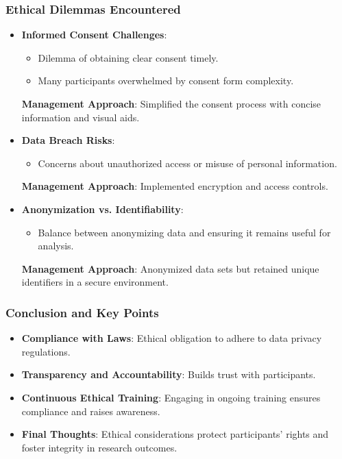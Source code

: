 \documentclass[aspectratio=169]{beamer}
\begin{document}
\begin{frame}[fragile]
  \frametitle{Ethical Dilemmas Encountered}
  \begin{itemize}
    \item \textbf{Informed Consent Challenges}:
      \begin{itemize}
        \item Dilemma of obtaining clear consent timely.
        \item Many participants overwhelmed by consent form complexity.
      \end{itemize}
      \textbf{Management Approach}: Simplified the consent process with concise information and visual aids.
      
    \item \textbf{Data Breach Risks}:
      \begin{itemize}
        \item Concerns about unauthorized access or misuse of personal information.
      \end{itemize}
      \textbf{Management Approach}: Implemented encryption and access controls.
      
    \item \textbf{Anonymization vs. Identifiability}:
      \begin{itemize}
        \item Balance between anonymizing data and ensuring it remains useful for analysis.
      \end{itemize}
      \textbf{Management Approach}: Anonymized data sets but retained unique identifiers in a secure environment.
  \end{itemize}
\end{frame}

\begin{frame}[fragile]
  \frametitle{Conclusion and Key Points}
  \begin{itemize}
    \item \textbf{Compliance with Laws}: Ethical obligation to adhere to data privacy regulations.
    
    \item \textbf{Transparency and Accountability}: Builds trust with participants.
    
    \item \textbf{Continuous Ethical Training}: Engaging in ongoing training ensures compliance and raises awareness.
    
    \item \textbf{Final Thoughts}: Ethical considerations protect participants' rights and foster integrity in research outcomes.
  \end{itemize}
\end{frame}
\end{document}
